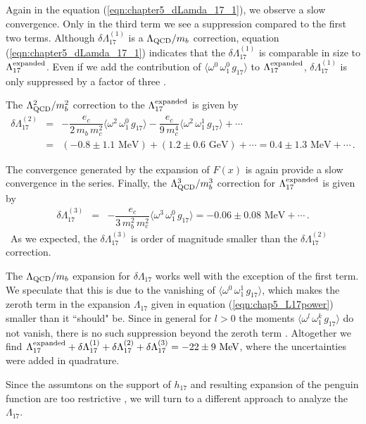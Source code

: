 Again in the equation (\ref{eqn:chapter5_dLamda_17_1}), we observe a slow convergence. Only in the third term we see a suppression compared to the first two terms. Although $\delta \Lambda_{17}^{(1)}$ is a $\Lambda_{\mbox{\scriptsize QCD}}/m_b$ correction, equation (\ref{eqn:chapter5_dLamda_17_1}) indicates that the $\delta \Lambda_{17}^{(1)}$ is comparable in size to $\Lambda_{17}^{\mbox{\scriptsize expanded}}$. Even if we add the contribution of $\langle\omega^0\,\omega_1^0\,g_{17}\rangle$ to $\Lambda_{17}^{\mbox{\scriptsize expanded}}$, $\delta \Lambda_{17}^{(1)}$ is only suppressed by a factor of  three \cite{Gunawardana:2019gep}.\par  
The $\Lambda^2_{\mbox{\scriptsize QCD}}/m^2_b$ correction to the $\Lambda_{17}^{\mbox{\scriptsize expanded}}$ is given by
\begin{eqnarray}
\delta \Lambda_{17}^{(2)}&=& -\dfrac{e_c}{2\,m_b\,m_c^2} \langle\omega^2\,\omega_1^0\,g_{17}\rangle-\dfrac{e_c}{9\,m_c^4} \langle\omega^2\,\omega_1^1\,g_{17}\rangle+\cdots\nonumber\\
&=&\left(-0.8\pm1.1\mbox{ MeV}\right)+\left(1.2\pm0.6\mbox{ GeV}\right)+\cdots=0.4\pm1.3\mbox{ MeV}+\cdots\,.
\end{eqnarray}

The convergence generated by the expansion of $F(x)$ is again provide a slow convergence in the series. Finally, the $\Lambda^3_{\mbox{\scriptsize QCD}}/m^3_b$ correction for  $\Lambda_{17}^{\mbox{\scriptsize expanded}}$ is given by 
\begin{eqnarray}
\delta \Lambda_{17}^{(3)}&=& -\dfrac{e_c}{3\,m_b^2\,m_c^2} \langle\omega^3\,\omega_1^0\,g_{17}\rangle=-0.06\pm0.08\mbox{ MeV}+\cdots\,.
\end{eqnarray}\
As we expected, the $\delta \Lambda_{17}^{(3)}$ is order of magnitude smaller than the $\delta \Lambda_{17}^{(2)}$ correction.\par
The $\Lambda_{\mbox{\scriptsize QCD}}/m_b$ expansion for $\delta \Lambda_{17}$ works well with the exception of the first term. We speculate that this is due to the vanishing of $\langle\omega^0\,\omega_1^1\,g_{17}\rangle$, which makes the zeroth term in the expansion $\Lambda_{17}$ given in equation (\ref{eqn:chap5_L17power}) smaller than it ``should" be. Since in general for $l>0$ the moments $\langle\omega^l\,\omega_1^k\,g_{17}\rangle$ do not vanish, there is no such suppression beyond the zeroth term \cite{Gunawardana:2019gep}. Altogether we find $\Lambda_{17}^{\mbox{\scriptsize expanded}}+\delta \Lambda_{17}^{(1)}+\delta \Lambda_{17}^{(2)}+\delta \Lambda_{17}^{(3)}=-22\pm9\mbox{ MeV}$, where the uncertainties were added in quadrature.\par
Since the assumtons on the support of $h_{17}$ and resulting
expansion of the penguin function are too restrictive \cite{Benzke:2010js, Gunawardana:2019gep}, we will turn to a different approach to analyze the $\Lambda_{17}$.

